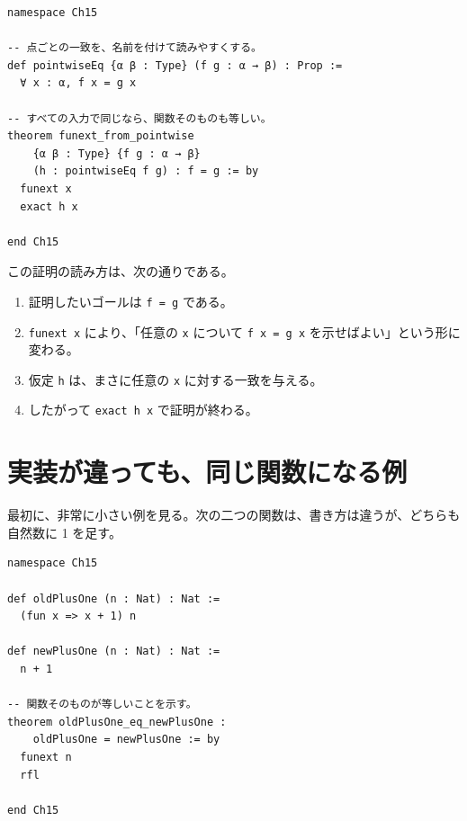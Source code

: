 \begin{listing}[htbp]
\begin{verbatim}
namespace Ch15

-- 点ごとの一致を、名前を付けて読みやすくする。
def pointwiseEq {α β : Type} (f g : α → β) : Prop :=
  ∀ x : α, f x = g x

-- すべての入力で同じなら、関数そのものも等しい。
theorem funext_from_pointwise
    {α β : Type} {f g : α → β}
    (h : pointwiseEq f g) : f = g := by
  funext x
  exact h x

end Ch15
\end{verbatim}
\caption{点ごとの一致から関数の等式へ}
\label{lst:ch15-pointwise-funext}
\end{listing}

この証明の読み方は、次の通りである。

\begin{enumerate}
\item 証明したいゴールは \texttt{f = g} である。
\item \texttt{funext x} により、「任意の \texttt{x} について \texttt{f x = g x} を示せばよい」という形に変わる。
\item 仮定 \texttt{h} は、まさに任意の \texttt{x} に対する一致を与える。
\item したがって \texttt{exact h x} で証明が終わる。
\end{enumerate}


\section{実装が違っても、同じ関数になる例}

最初に、非常に小さい例を見る。次の二つの関数は、書き方は違うが、どちらも自然数に 1 を足す。

\begin{listing}[htbp]
\begin{verbatim}
namespace Ch15

def oldPlusOne (n : Nat) : Nat :=
  (fun x => x + 1) n

def newPlusOne (n : Nat) : Nat :=
  n + 1

-- 関数そのものが等しいことを示す。
theorem oldPlusOne_eq_newPlusOne :
    oldPlusOne = newPlusOne := by
  funext n
  rfl

end Ch15
\end{verbatim}
\caption{書き方が違う関数の等しさ}
\label{lst:ch15-old-new-plus-one}
\end{listing}

